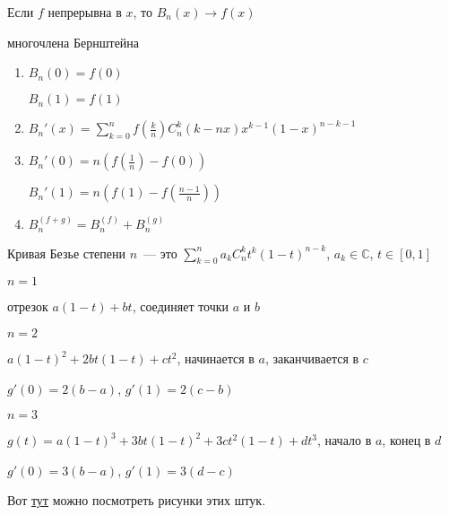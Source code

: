 \begin{notice}
	Если $f$ непрерывна в $x$, то $B_n(x) \rightarrow f(x)$
\end{notice}

\begin{properties}
	многочлена Бернштейна
	
	\begin{enumerate}
		\item $B_n(0) = f(0)$
		
		$B_n(1) = f(1)$
		
		\item $B_n'(x) = \sum\limits_{k = 0}^n f(\frac{k}{n})C_n^k (k-nx)x^{k-1} (1-x)^{n-k-1}$
		
		\item $B_n'(0) = n(f(\frac{1}{n}) - f(0))$
		
		$B_n'(1) = n(f(1) - f(\frac{n-1}{n}))$
		
		\item $B_n^{(f+g)} = B_n^{(f)} + B_n^{(g)}$
	\end{enumerate}
\end{properties}

\begin{definition}
	Кривая Безье степени $n$~--- это $\sum\limits_{k = 0}^n a_k C_n^k t^k (1-t)^{n-k}$, $a_k \in \mathbb{C}$, $t \in [0, 1]$
	
	$n = 1$ 
	
	отрезок $a(1-t) + bt$, соединяет точки $a$ и $b$
	
	$n = 2$  
	
	$a(1-t)^2 + 2bt(1-t) + ct^2$, начинается в $a$, заканчивается в $c$
	
	$g'(0) = 2(b-a)$, $g'(1) = 2(c-b)$
	
	$n = 3$
	
	$g(t) = a(1-t)^3 + 3bt(1-t)^2 + 3ct^2(1-t) + dt^3$, начало в $a$, конец в $d$
	
	$g'(0) = 3(b-a)$, $g'(1) = 3(d-c)$
	
	Вот \href{https://www.jasondavies.com/animated-bezier/}{тут} можно посмотреть рисунки этих штук.
\end{definition}



\newpage

